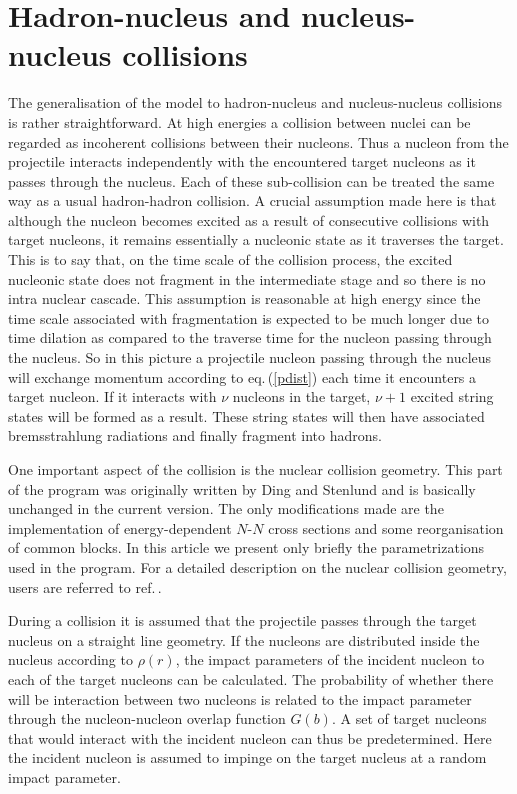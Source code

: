 \section{Hadron-nucleus and nucleus-nucleus collisions}

The generalisation of the model to hadron-nucleus and nucleus-nucleus
collisions is rather straightforward.  At high energies a collision between
nuclei can be regarded as incoherent collisions between their nucleons.
Thus a nucleon from the projectile interacts independently with the
encountered target nucleons as it passes through the nucleus. 
Each of these sub-collision can be treated the same way as a usual
hadron-hadron collision.  A crucial assumption made here is that although
the nucleon becomes excited as a result of consecutive collisions with
target nucleons, it remains essentially a nucleonic state as 
it traverses the target.  This is to say that, on the time scale of
the collision process, the excited nucleonic state does not fragment
in the intermediate stage and so there is no intra nuclear cascade.  
This assumption is reasonable at high energy since the time scale associated
with fragmentation is expected to be much longer due to time dilation
as compared to the traverse time for the nucleon passing through the nucleus.
So in this picture a projectile nucleon passing through the nucleus
will exchange momentum according to eq.\,(\ref{pdist}) each time it encounters
a target nucleon.  If it interacts with $\nu$ nucleons in the target,
$\nu+1$ excited string states will be formed as a result.  These string
states will then have associated bremsstrahlung radiations and finally
fragment into hadrons. 

One important aspect of the collision is the nuclear collision geometry.
This part of the program was originally written by Ding and Stenlund
and is basically unchanged in the current version.  The only modifications
made are the implementation of energy-dependent $N$-$N$ cross sections
and some reorganisation of common blocks.  In this article we present
only briefly the parametrizations used in the program.     
For a detailed description on the nuclear collision geometry, users are 
referred to ref.\,\cite{ngeo}. 
  
During a collision it is assumed that the projectile passes 
through the target nucleus 
on a straight line geometry.  If the nucleons are distributed inside the nucleus
according to $\rho(r)$, the impact parameters of the incident nucleon
to each of the target nucleons can be calculated.  The probability of
whether there will be interaction between two nucleons is related to the impact parameter through the nucleon-nucleon overlap function $G(b)$.  A set of
target nucleons that would interact with the incident nucleon can thus be predetermined.  Here the incident nucleon is assumed to impinge on the
target nucleus at a random impact parameter.

